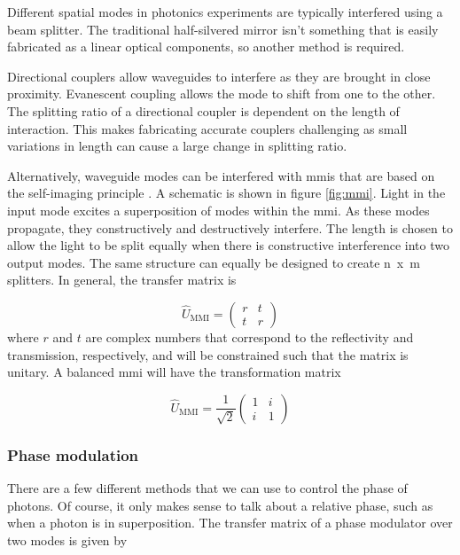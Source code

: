 Different spatial modes in photonics experiments are typically interfered using a beam splitter. The traditional half-silvered mirror isn't something that is easily fabricated as a linear optical components, so another method is required.

Directional couplers allow waveguides to interfere as they are brought in close proximity. Evanescent coupling allows the mode to shift from one to the other. The splitting ratio of a directional coupler is dependent on the length of interaction. This makes fabricating accurate couplers challenging as small variations in length can cause a large change in splitting ratio.

Alternatively, waveguide modes can be interfered with \acp{mmi} that are based on the self-imaging principle \cite{soldano1995optical}. A schematic is shown in figure \ref{fig:mmi}. Light in the input mode excites a superposition of modes within the \ac{mmi}. As these modes propagate, they constructively and destructively interfere. The length is chosen to allow the light to be split equally when there is constructive interference into two output modes. The same structure can equally be designed to create \si{n x m} splitters. In general, the transfer matrix is

\begin{equation}
	\hat{U}_\mathrm{MMI} = \left(
	\begin{matrix}
	r & t\\
	t & r
	\end{matrix}
	\right)
\end{equation}
where $r$ and $t$ are complex numbers that correspond to the reflectivity and transmission, respectively, and will be constrained such that the matrix is unitary. A balanced \ac{mmi} will have the transformation matrix

\begin{equation}
	\hat{U}_\mathrm{MMI} = \frac{1}{\sqrt{2}}\left(
	\begin{matrix}
	1 & i\\
	i & 1
	\end{matrix}
	\right)
\end{equation}

\subsubsection*{Phase modulation}

There are a few different methods that we can use to control the phase of photons. Of course, it only makes sense to talk about a relative phase, such as when a photon is in superposition. The transfer matrix of a phase modulator over two modes is given by


